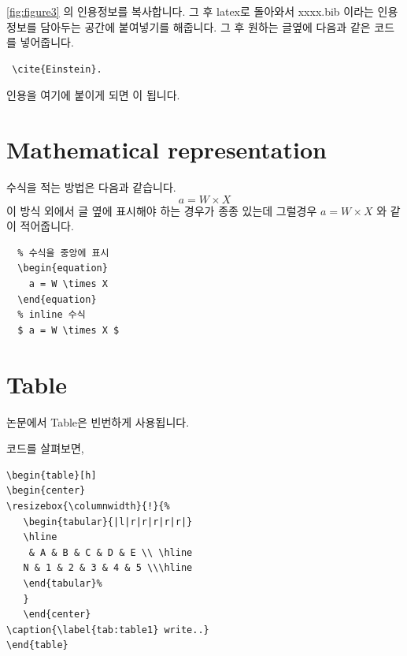 \documentclass[twocolumn, 10pt]{article}
\begin{document}
\begin{CJK}{UTF8}{}
\autoref{fig:figure3} 의 인용정보를 복사합니다. 그 후 latex로 돌아와서 xxxx.bib 이라는 인용정보를 담아두는 공간에 붙여넣기를 해줍니다. 
그 후 원하는 글옆에 다음과 같은 코드를 넣어줍니다. 
\begin{verbatim}
 \cite{Einstein}.   
\end{verbatim}
인용을 여기에 붙이게 되면\cite{Einstein} 이 됩니다.

\section{Mathematical representation}
수식을 적는 방법은 다음과 같습니다. 
\begin{equation}
a = W \times X
\end{equation}
이 방식 외에서 글 옆에 표시해야 하는 경우가 종종 있는데 그럴경우 $a = W \times X$ 와 같이 적어줍니다.
\begin{verbatim}
  % 수식을 중앙에 표시
  \begin{equation} 
    a = W \times X
  \end{equation}  
  % inline 수식
  $ a = W \times X $
\end{verbatim}

\section{Table}
논문에서 Table은 빈번하게 사용됩니다.

\begin{table}[ht]
\begin{center}
   \end{center}
\caption{\label{tab:table1} 이곳에 Table의 설명을 적으세요.}
\end{table}
코드를 살펴보면, 

\begin{verbatim}
\begin{table}[h]
\begin{center}
\resizebox{\columnwidth}{!}{%
   \begin{tabular}{|l|r|r|r|r|r|}
   \hline
    & A & B & C & D & E \\ \hline
   N & 1 & 2 & 3 & 4 & 5 \\\hline
   \end{tabular}%
   }
   \end{center}
\caption{\label{tab:table1} write..}
\end{table}
\end{verbatim}


\end{CJK}
\end{document}
